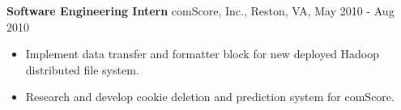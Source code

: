 {\bf Software Engineering Intern} \hfill comScore, Inc., Reston, VA, May 2010 - Aug 2010
\begin{itemize}
\item Implement data transfer and formatter block for new deployed Hadoop distributed file system.
\item Research and develop cookie deletion and prediction system for comScore.
\end{itemize}



